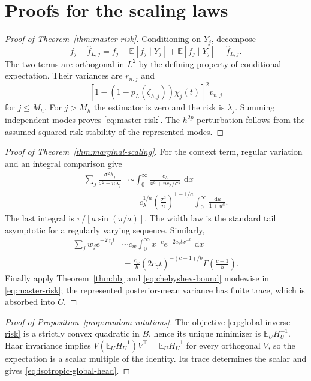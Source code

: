 \documentclass[11pt,a4paper]{article}
\numberwithin{equation}{section}
\theoremstyle{definition}
\theoremstyle{remark}
\newcommand{\E}{\mathbb E}
\newcommand{\dd}{\,\mathrm d}
\newcommand{\wh}{\widehat}
\begin{document}
\section{Proofs for the scaling laws}

\begin{proof}[Proof of Theorem~\ref{thm:master-risk}]
Conditioning on $Y_j$, decompose
\[
 f_j-\wh f_{L,j}
 =f_j-\E[f_j\mid Y_j]
 +\E[f_j\mid Y_j]-\wh f_{L,j}.
\]
The two terms are orthogonal in $L^2$ by the defining property of conditional
expectation.  Their variances are $r_{n,j}$ and
\[
 \left[1-(1-p_L(\zeta_{h,j}))\chi_j(t)\right]^2v_{n,j}
\]
for $j\le M_h$.  For $j>M_h$ the estimator is zero and the risk is
$\lambda_j$.  Summing independent modes proves \eqref{eq:master-risk}.  The
$h^{2p}$ perturbation follows from the assumed squared-risk stability of the
represented modes.
\end{proof}

\begin{proof}[Proof of Theorem~\ref{thm:marginal-scaling}]
For the context term, regular variation and an integral comparison give
\begin{align*}
 \sum_j\frac{\sigma^2\lambda_j}{\sigma^2+n\lambda_j}
 &\sim\int_0^\infty
 \frac{c_\lambda}{x^a+nc_\lambda/\sigma^2}\,\dd x\\
 &=c_\lambda^{1/a}
 \left(\frac{\sigma^2}{n}\right)^{1-1/a}
 \int_0^\infty\frac{\dd u}{1+u^a}.
\end{align*}
The last integral is $\pi/[a\sin(\pi/a)]$.  The width law is the standard
tail asymptotic for a regularly varying sequence.  Similarly,
\begin{align*}
 \sum_jw_je^{-2\gamma_jt}
 &\sim c_w\int_0^\infty x^{-c}
 e^{-2c_\gamma t x^{-b}}\,\dd x\\
 &=\frac{c_w}{b}(2c_\gamma t)^{-(c-1)/b}
 \Gamma\!\left(\frac{c-1}{b}\right).
\end{align*}
Finally apply Theorem~\ref{thm:hb} and
\eqref{eq:chebyshev-bound} modewise in
\eqref{eq:master-risk}; the represented posterior-mean variance has finite
trace, which is absorbed into $C$.
\end{proof}

\begin{proof}[Proof of Proposition~\ref{prop:random-rotations}]
The objective \eqref{eq:global-inverse-risk} is a strictly convex quadratic in
$B$, hence its unique minimizer is $\E_UH_U^{-1}$.  Haar invariance implies
$V(\E_UH_U^{-1})V^\top=\E_UH_U^{-1}$ for every orthogonal $V$, so the
expectation is a scalar multiple of the identity.  Its trace determines the
scalar and gives \eqref{eq:isotropic-global-head}.
\end{proof}
\end{document}
